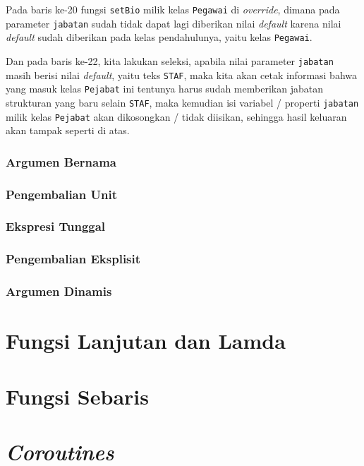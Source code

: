 Pada baris ke-20 fungsi \texttt{setBio} milik kelas \texttt{Pegawai} di \textit{override}, dimana pada parameter \texttt{jabatan} sudah tidak dapat lagi diberikan nilai \textit{default} karena nilai \textit{default} sudah diberikan pada kelas pendahulunya, yaitu kelas \texttt{Pegawai}.

Dan pada baris ke-22, kita lakukan seleksi, apabila nilai parameter \texttt{jabatan} masih berisi nilai \textit{default}, yaitu teks \texttt{STAF}, maka kita akan cetak informasi bahwa yang masuk kelas \texttt{Pejabat} ini tentunya harus sudah memberikan jabatan strukturan yang baru selain \texttt{STAF}, maka kemudian isi variabel / properti \texttt{jabatan} milik kelas \texttt{Pejabat} akan dikosongkan / tidak diisikan, sehingga hasil keluaran akan tampak seperti di atas.

\subsubsection{Argumen Bernama}

\subsubsection{Pengembalian Unit}

\subsubsection{Ekspresi Tunggal}

\subsubsection{Pengembalian Eksplisit}

\subsubsection{Argumen Dinamis}

\section{Fungsi Lanjutan dan Lamda}

\section{Fungsi Sebaris}

\section{\textit{Coroutines}}
